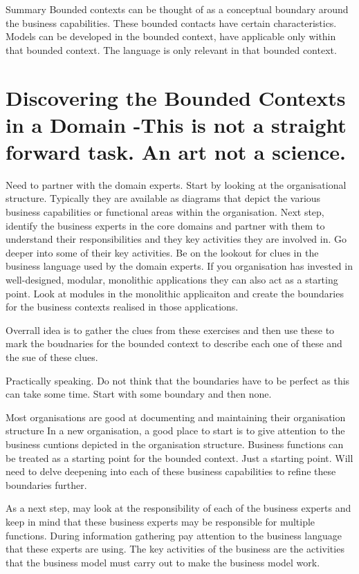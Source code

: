 Summary
Bounded contexts can be thought of as a conceptual boundary around the business capabilities.
These bounded contacts have certain characteristics.
Models can be developed in the bounded context, have applicable only within that bounded context.
The language is only relevant in that bounded context.


\section{Discovering the Bounded Contexts in a Domain -This is not a straight forward task. An art not a science.}

Need to partner with the domain experts.
Start by looking at the organisational structure.
Typically they are available as diagrams that depict the various business capabilities or functional areas within the organisation.
Next step, identify the business experts in the core domains and partner with them to understand their responsibilities and they key activities they are involved in.
Go deeper into some of their key activities.
Be on the lookout for clues in the business language used by the domain experts.
If you organisation has invested in well-designed, modular, monolithic applications they can also act as a starting point.
Look at modules in the monolithic applicaiton and create the boundaries for the business contexts realised in those applications.

Overrall idea is to gather the clues from these exercises and then use these to mark the boudnaries for the bounded context to describe each one of these and the sue of these clues.

Practically speaking. Do not think that the boundaries have to be perfect as this can take some time.
Start with some boundary and then none.

Most organisations are good at documenting and maintaining their organisation structure
In a new organisation, a good place to start is to give attention to the business cuntions depicted in the organisation structure.
Business functions can be treated as a starting point for the bounded context.
Just a starting point.
Will need to delve deepening into each of these business capabilities to refine these boundaries further.

As a next step, may look at the responsibility of each of the business experts and keep in mind that these business experts may be responsible for multiple functions.
During information gathering pay attention to the business language that these experts are using.
The key activities of the business are the activities that the business model must carry out to make the business model work.

